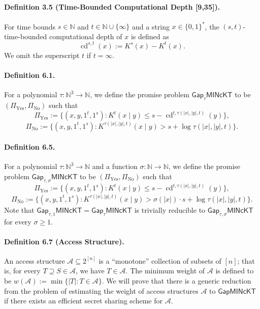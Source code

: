 \paragraph{Definition 3.5 (Time-Bounded Computational Depth [9,35]).}
For time bounds $s\in\mathbb N$ and $t\in\mathbb N\cup\{\infty\}$ and a string $x\in\{0,1\}^*$, the $(s,t)$-time-bounded computational depth of $x$ is defined as
\[\operatorname{cd}^{s,t}(x):=K^s(x)-K^t(x).\]
We omit the superscript $t$ if $t=\infty$.
\paragraph{Definition 6.1.}
For a polynomial $\tau:\mathbb N^3\to\mathbb N$, we define the promise problem $\mathsf{Gap}_{\tau}\mathsf{MINcKT}$ to be $(\Pi_{\mathrm{Yes}},\Pi_{\mathrm{No}})$ such that
\[\Pi_{\mathrm{Yes}}:=\{(x,y,1^t,1^s):K^t(x\mid y)\leq s-\operatorname{cd}^{t,\tau(|x|,|y|,t)}(y)\},\]
\[\Pi_{\mathrm{No}}:=\{(x,y,1^t,1^s):K^{\tau(|x|,|y|,t)}(x\mid y)>s+\log\tau(|x|,|y|,t)\}.\]
\paragraph{Definition 6.5.}
For a polynomial $\tau:\mathbb N^3\to\mathbb N$ and a function $\sigma:\mathbb N\to\mathbb N$, we define the promise problem $\mathsf{Gap}_{\tau,\sigma}\mathsf{MINcKT}$ to be $(\Pi_{\mathrm{Yes}},\Pi_{\mathrm{No}})$ such that
\[\Pi_{\mathrm{Yes}}:=\{(x,y,1^t,1^s):K^t(x\mid y)\leq s-\operatorname{cd}^{t,\tau(|x|,|y|,t)}(y)\},\]
\[\Pi_{\mathrm{No}}:=\{(x,y,1^t,1^s):K^{\tau(|x|,|y|,t)}(x\mid y)>\sigma(|x|)\cdot s+\log\tau(|x|,|y|,t)\}.\]
Note that $\mathsf{Gap}_{\tau,1}\mathsf{MINcKT}=\mathsf{Gap}_{\tau}\mathsf{MINcKT}$ is trivially reducible to $\mathsf{Gap}_{\tau,\sigma}\mathsf{MINcKT}$ for every $\sigma\geq1$.
\paragraph{Definition 6.7 (Access Structure).}
An access structure $\mathcal A\subseteq2^{[n]}$ is a ``monotone'' collection of subsets of $[n]$; that is, for every $T\supseteq S\in\mathcal A$, we have $T\in\mathcal A$. The minimum weight of $\mathcal A$ is defined to be $w(\mathcal A):=\min\{|T|:T\in\mathcal A\}$.
We will prove that there is a generic reduction from the problem of estimating the weight of access structures $\mathcal A$ to $\mathsf{GapMINcKT}$ if there exists an efficient secret sharing scheme for $\mathcal A$.
